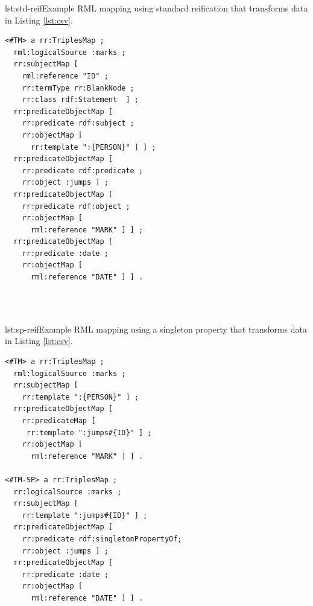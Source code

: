 \begin{minipage}{0.45\linewidth}
\begin{captionedlisting}{lst:std-reif}{Example RML mapping using standard reification that transforms data in Listing \ref{lst:csv}.}
\centering
{\begin{lstlisting}[basicstyle=\ttfamily\small,label={list:example1},columns=flexible]
<#TM> a rr:TriplesMap ;
  rml:logicalSource :marks ;
  rr:subjectMap [ 
    rml:reference "ID" ;
    rr:termType rr:BlankNode ;
    rr:class rdf:Statement  ] ;
  rr:predicateObjectMap [ 
    rr:predicate rdf:subject ;
    rr:objectMap [
      rr:template ":{PERSON}" ] ] ;
  rr:predicateObjectMap [ 
    rr:predicate rdf:predicate ;
    rr:object :jumps ] ;
  rr:predicateObjectMap [ 
    rr:predicate rdf:object ;
    rr:objectMap [
      rml:reference "MARK" ] ] ;
  rr:predicateObjectMap [ 
    rr:predicate :date ;
    rr:objectMap [
      rml:reference "DATE" ] ] .
  
\end{lstlisting}}

\end{captionedlisting}
\end{minipage}
\,\,\,\,\hfill
\begin{minipage}{0.45\linewidth}
\begin{captionedlisting}{lst:sp-reif}{Example RML mapping using a singleton property that transforms data in Listing \ref{lst:csv}.}
\centering
{{\begin{lstlisting}[basicstyle=\ttfamily\small,label={list:example1},columns=flexible]
<#TM> a rr:TriplesMap ;
  rml:logicalSource :marks ;
  rr:subjectMap [ 
    rr:template ":{PERSON}" ] ;
  rr:predicateObjectMap [ 
    rr:predicateMap [
     rr:template ":jumps#{ID}" ] ;
    rr:objectMap [
      rml:reference "MARK" ] ] .
      
<#TM-SP> a rr:TriplesMap ;
  rr:logicalSource :marks ;
  rr:subjectMap [ 
    rr:template ":jumps#{ID}" ] ;
  rr:predicateObjectMap [ 
    rr:predicate rdf:singletonPropertyOf;
    rr:object :jumps ] ;
  rr:predicateObjectMap [ 
    rr:predicate :date ;
    rr:objectMap [
      rml:reference "DATE" ] ] .
\end{lstlisting}}}
\end{captionedlisting}
\end{minipage}




